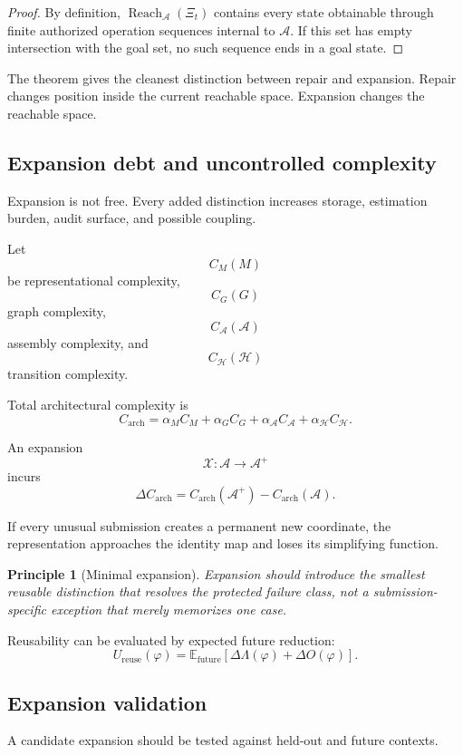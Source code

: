 \documentclass[11pt]{article}
\newtheorem{principle}[definition]{Principle}
\theoremstyle{definition}
\DeclareMathOperator{\Reach}{Reach}
\newcommand{\E}{\mathbb{E}}
\newcommand{\A}{\mathcal{A}}
\newcommand{\Hh}{\mathcal{H}}
\begin{document}
\begin{proof}
By definition, \(\Reach_{\mathcal A}(\Xi_t)\) contains every state obtainable through finite authorized operation sequences internal to \(\mathcal A\). If this set has empty intersection with the goal set, no such sequence ends in a goal state.
\end{proof}

The theorem gives the cleanest distinction between repair and expansion. Repair changes position inside the current reachable space. Expansion changes the reachable space.

\subsection{Expansion debt and uncontrolled complexity}

Expansion is not free. Every added distinction increases storage, estimation burden, audit surface, and possible coupling.

Let
\[
C_M(M)
\]
be representational complexity,
\[
C_G(G)
\]
graph complexity,
\[
C_{\A}(\A)
\]
assembly complexity, and
\[
C_{\Hh}(\Hh)
\]
transition complexity.

Total architectural complexity is
\[
C_{\mathrm{arch}}
=
\alpha_M C_M
+
\alpha_G C_G
+
\alpha_{\A}C_{\A}
+
\alpha_{\Hh}C_{\Hh}.
\]

An expansion
\[
\mathcal X:
\mathcal A\to\mathcal A^{+}
\]
incurs
\[
\Delta C_{\mathrm{arch}}
=
C_{\mathrm{arch}}(\mathcal A^{+})
-
C_{\mathrm{arch}}(\mathcal A).
\]

If every unusual submission creates a permanent new coordinate, the representation approaches the identity map and loses its simplifying function.

\begin{principle}[Minimal expansion]
Expansion should introduce the smallest reusable distinction that resolves the protected failure class, not a submission-specific exception that merely memorizes one case.
\end{principle}

Reusability can be evaluated by expected future reduction:
\[
U_{\mathrm{reuse}}(\varphi)
=
\E_{\mathrm{future}}
\left[
\Delta\Lambda(\varphi)
+
\Delta O(\varphi)
\right].
\]

\subsection{Expansion validation}

A candidate expansion should be tested against held-out and future contexts.
\end{document}
